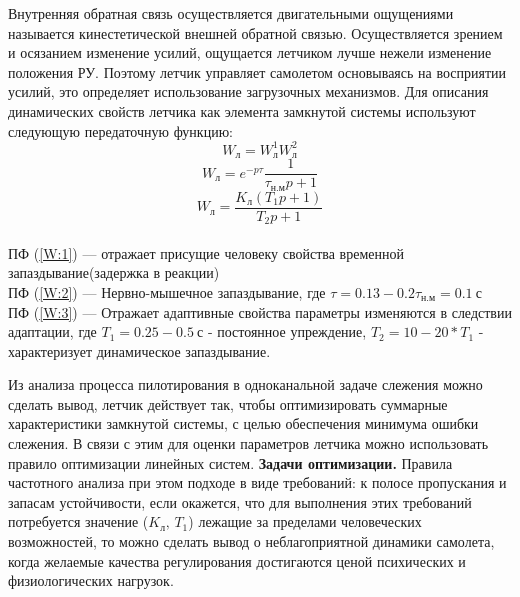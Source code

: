 \documentclass{article}
\begin{document}
Внутренняя обратная связь осуществляется двигательными ощущениями называется
кинестетической внешней обратной связью. Осуществляется зрением и осязанием
изменение усилий, ощущается летчиком лучше нежели изменение положения РУ.
Поэтому летчик управляет самолетом основываясь на восприятии усилий, это
определяет использование загрузочных механизмов. Для описания динамических
свойств летчика как элемента замкнутой системы используют следующую
передаточную функцию:
\begin{equation} \label{W:1}
    W_\text{л} = W_\text{л}^1 W_\text{л}^2
\end{equation}
\begin{equation} \label{W:2}
    W_\text{л} = e^{-p\tau} \frac{1}{\tau_\text{н.м} p +1}
\end{equation}
\begin{equation} \label{W:3}
    W_\text{л} = \frac{K_\text{л}(T_1 p + 1)}{T_2 p +1}
\end{equation}\\
ПФ (\ref{W:1}) --- отражает присущие человеку свойства временной
запаздывание(задержка в реакции)\\
ПФ (\ref{W:2}) --- Нервно-мышечное запаздывание, где $\tau = 0.13 - 0.2
\tau_\text{н.м}= 0.1 \ \text{с}$ \\
ПФ (\ref{W:3}) --- Отражает адаптивные свойства параметры изменяются в
следствии адаптации, где $T_1 = 0.25 - 0.5 \ \text{с}$ - постоянное упреждение,
$T_2 = 10 - 20 * T_1$ - характеризует динамическое запаздывание.

Из анализа процесса пилотирования в одноканальной задаче слежения можно сделать
вывод, летчик действует так, чтобы оптимизировать суммарные характеристики
замкнутой системы, с целью обеспечения минимума ошибки слежения. В связи с этим
для оценки параметров летчика можно использовать правило оптимизации линейных
систем.
\textbf{Задачи оптимизации.} Правила частотного анализа при этом подходе в виде
требований: к полосе пропускания и запасам устойчивости, если окажется, что для
выполнения этих требований потребуется значение ($K_\text{л}, \, T_1$) лежащие
за пределами человеческих возможностей, то можно сделать вывод о
неблагоприятной динамики самолета, когда желаемые качества регулирования
достигаются ценой психических и физиологических нагрузок.
\end{document}
